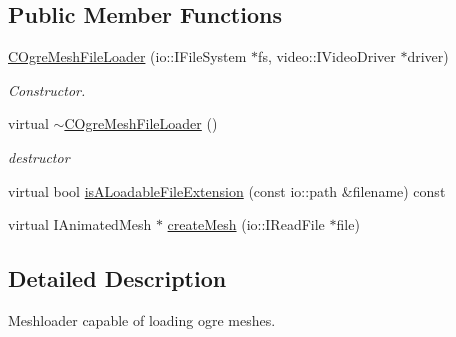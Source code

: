 \subsection*{Public Member Functions}
\begin{DoxyCompactItemize}
\item 
\hypertarget{classirr_1_1scene_1_1_c_ogre_mesh_file_loader_a1a67cfd56997f1bfd47a743d7156849d}{\hyperlink{classirr_1_1scene_1_1_c_ogre_mesh_file_loader_a1a67cfd56997f1bfd47a743d7156849d}{C\-Ogre\-Mesh\-File\-Loader} (io\-::\-I\-File\-System $\ast$fs, video\-::\-I\-Video\-Driver $\ast$driver)}\label{classirr_1_1scene_1_1_c_ogre_mesh_file_loader_a1a67cfd56997f1bfd47a743d7156849d}

\begin{DoxyCompactList}\small\item\em Constructor. \end{DoxyCompactList}\item 
\hypertarget{classirr_1_1scene_1_1_c_ogre_mesh_file_loader_a3b1647b36895ab8553c6c7155473d16a}{virtual \hyperlink{classirr_1_1scene_1_1_c_ogre_mesh_file_loader_a3b1647b36895ab8553c6c7155473d16a}{$\sim$\-C\-Ogre\-Mesh\-File\-Loader} ()}\label{classirr_1_1scene_1_1_c_ogre_mesh_file_loader_a3b1647b36895ab8553c6c7155473d16a}

\begin{DoxyCompactList}\small\item\em destructor \end{DoxyCompactList}\item 
virtual bool \hyperlink{classirr_1_1scene_1_1_c_ogre_mesh_file_loader_a86ff8c28d4d92e28682514d0eb8ff88e}{is\-A\-Loadable\-File\-Extension} (const io\-::path \&filename) const 
\item 
virtual I\-Animated\-Mesh $\ast$ \hyperlink{classirr_1_1scene_1_1_c_ogre_mesh_file_loader_af344b0d7f0e94446074576fedcea344b}{create\-Mesh} (io\-::\-I\-Read\-File $\ast$file)
\end{DoxyCompactItemize}


\subsection{Detailed Description}
Meshloader capable of loading ogre meshes. 

